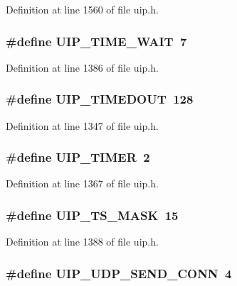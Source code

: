 Definition at line 1560 of file uip.h.

\hypertarget{group__uip_gafff0ed43201bf1e2020de1a0d6cac070}{
\subsubsection[{UIP\_\-TIME\_\-WAIT}]{\setlength{\rightskip}{0pt plus 5cm}\#define UIP\_\-TIME\_\-WAIT~7}}
\label{group__uip_gafff0ed43201bf1e2020de1a0d6cac070}


Definition at line 1386 of file uip.h.

\hypertarget{group__uip_ga2d3ba4b14d6d2f6576f9b547800b7945}{
\subsubsection[{UIP\_\-TIMEDOUT}]{\setlength{\rightskip}{0pt plus 5cm}\#define UIP\_\-TIMEDOUT~128}}
\label{group__uip_ga2d3ba4b14d6d2f6576f9b547800b7945}


Definition at line 1347 of file uip.h.

\hypertarget{group__uip_ga041aea91aa6ef84dcc6cac3c51db9b2f}{
\subsubsection[{UIP\_\-TIMER}]{\setlength{\rightskip}{0pt plus 5cm}\#define UIP\_\-TIMER~2}}
\label{group__uip_ga041aea91aa6ef84dcc6cac3c51db9b2f}


Definition at line 1367 of file uip.h.

\hypertarget{group__uip_ga13dfcb4a5f920e108253ade527a66cc2}{
\subsubsection[{UIP\_\-TS\_\-MASK}]{\setlength{\rightskip}{0pt plus 5cm}\#define UIP\_\-TS\_\-MASK~15}}
\label{group__uip_ga13dfcb4a5f920e108253ade527a66cc2}


Definition at line 1388 of file uip.h.

\hypertarget{group__uip_ga5c97ae587595b5444be80f5ecc1d3382}{
\subsubsection[{UIP\_\-UDP\_\-SEND\_\-CONN}]{\setlength{\rightskip}{0pt plus 5cm}\#define UIP\_\-UDP\_\-SEND\_\-CONN~4}}
\label{group__uip_ga5c97ae587595b5444be80f5ecc1d3382}


